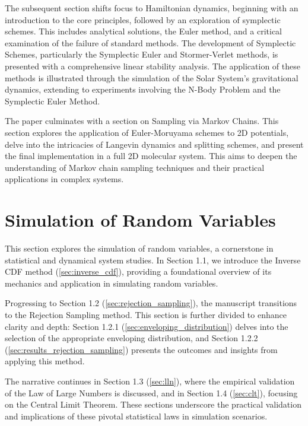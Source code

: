 \documentclass{article}
\begin{document}
The subsequent section shifts focus to Hamiltonian dynamics, beginning with an introduction to the core principles, followed by an exploration of symplectic schemes. This includes analytical solutions, the Euler method, and a critical examination of the failure of standard methods. The development of Symplectic Schemes, particularly the Symplectic Euler and Stormer-Verlet methods, is presented with a comprehensive linear stability analysis. The application of these methods is illustrated through the simulation of the Solar System's gravitational dynamics, extending to experiments involving the N-Body Problem and the Symplectic Euler Method.

The paper culminates with a section on Sampling via Markov Chains. This section explores the application of Euler-Moruyama schemes to 2D potentials, delve into the intricacies of Langevin dynamics and splitting schemes, and present the final implementation in a full 2D molecular system. This aims to deepen the understanding of Markov chain sampling techniques and their practical applications in complex systems.

\newpage

\section{Simulation of Random Variables}
\label{sec:simulation_of_random_variables}

This section explores the simulation of random variables, a cornerstone in statistical and dynamical system studies. In Section 1.1, we introduce the Inverse CDF method (\ref{sec:inverse_cdf}), providing a foundational overview of its mechanics and application in simulating random variables.

Progressing to Section 1.2 (\ref{sec:rejection_sampling}), the manuscript transitions to the Rejection Sampling method. This section is further divided to enhance clarity and depth: Section 1.2.1 (\ref{sec:enveloping_distribution}) delves into the selection of the appropriate enveloping distribution, and Section 1.2.2 (\ref{sec:results_rejection_sampling}) presents the outcomes and insights from applying this method.

The narrative continues in Section 1.3 (\ref{sec:lln}), where the empirical validation of the Law of Large Numbers is discussed, and in Section 1.4 (\ref{sec:clt}), focusing on the Central Limit Theorem. These sections underscore the practical validation and implications of these pivotal statistical laws in simulation scenarios.
\end{document}
